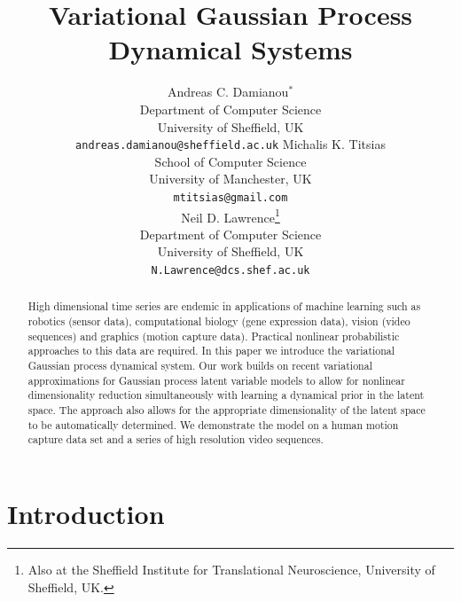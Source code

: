 \documentclass{article} %
\title{Variational Gaussian Process Dynamical Systems}
\author{
 Andreas C. Damianou$^*$ \\
 Department of Computer Science\\
 University of Sheffield, UK \\ %
\texttt{andreas.damianou@sheffield.ac.uk}
            \And
 Michalis K. Titsias \\
 School of Computer Science\\
 University of Manchester, UK \\ %
\texttt{mtitsias@gmail.com} \\
            \And            
 Neil D. Lawrence\thanks{Also at the Sheffield Institute for Translational Neuroscience, University of Sheffield, UK.} \\ %
 Department of Computer Science\\
 University of Sheffield, UK \\ %
\texttt{N.Lawrence@dcs.shef.ac.uk} 
 }
\begin{document}
\newcommand{\highlight}[1]{\colorbox{yellow}{#1}}

\newcommand{\bff}{\mathbf{f}}
\newcommand{\bfu}{\mathbf{u}}
\newcommand{\bfy}{\mathbf{y}}
\newcommand{\bfx}{\mathbf{x}}
\newcommand{\bft}{\mathbf{t}}
\newcommand{\bfk}{\mathbf{k}}
\newcommand{\bfmu}{\boldsymbol \mu}
\newcommand{\bfz}{\mathbf{0}}

\newcommand{\T}{{\top}}

\newcommand{\bfa}{\mathbf{a}}
\newcommand{\bb}{\beta^{-1}}
\newcommand{\la}{\left\langle}
\newcommand{\ra}{\right\rangle}
\newcommand{\vv}{\vartheta}

\newcommand{\intd}{\text{d}}

\date{}
\maketitle

\begin{abstract}
  High dimensional time series are endemic in applications of machine
  learning such as robotics (sensor data), computational biology (gene
  expression data), vision (video sequences) and graphics (motion
  capture data). Practical nonlinear probabilistic approaches to this
  data are required. In this paper we introduce the variational
  Gaussian process dynamical system. Our work builds on recent
  variational approximations for Gaussian process latent variable
  models to allow for nonlinear dimensionality reduction
  simultaneously with learning a dynamical prior in the latent
  space. The approach also allows for the appropriate dimensionality
  of the latent space to be automatically determined. We demonstrate
  the model on a human motion capture data set and a series of high
  resolution video sequences.
\end{abstract}



\section{Introduction}
\end{document}
